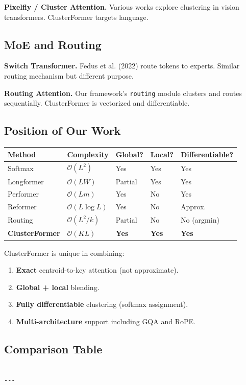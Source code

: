 \textbf{Pixelfly / Cluster Attention.} Various works explore clustering in vision 
transformers. ClusterFormer targets language.

\subsection{MoE and Routing}

\textbf{Switch Transformer.} Fedus et al. (2022) route tokens to experts. Similar 
routing mechanism but different purpose.

\textbf{Routing Attention.} Our framework's \texttt{routing} module clusters and routes 
sequentially. ClusterFormer is vectorized and differentiable.

\subsection{Position of Our Work}

\begin{table}[H]
\centering
\small
\begin{tabular}{lllll}
\toprule
\textbf{Method} & \textbf{Complexity} & \textbf{Global?} & \textbf{Local?} & \textbf{Differentiable?} \\
\midrule
Softmax & $\mathcal{O}(L^2)$ & Yes & Yes & Yes \\
Longformer & $\mathcal{O}(LW)$ & Partial & Yes & Yes \\
Performer & $\mathcal{O}(Lm)$ & Yes & No & Yes \\
Reformer & $\mathcal{O}(L\log L)$ & Yes & No & Approx. \\
Routing & $\mathcal{O}(L^2/k)$ & Partial & No & No (argmin) \\
\textbf{ClusterFormer} & $\mathcal{O}(KL)$ & \textbf{Yes} & \textbf{Yes} & \textbf{Yes} \\
\bottomrule
\end{tabular}
\end{table}

ClusterFormer is unique in combining:
\begin{enumerate}
\item \textbf{Exact} centroid-to-key attention (not approximate).
\item \textbf{Global + local} blending.
\item \textbf{Fully differentiable} clustering (softmax assignment).
\item \textbf{Multi-architecture} support including GQA and RoPE.

\end{enumerate}
\subsection{Comparison Table}

\begin{lstlisting}

---
\end{lstlisting}